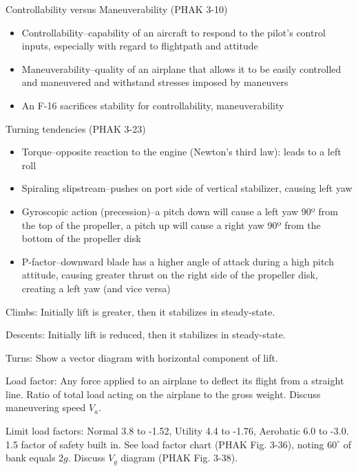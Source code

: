 Controllability versus Maneuverability (PHAK 3-10)

\begin{itemize}
  \item Controllability--capability of an aircraft to respond to the pilot's
    control inputs, especially with regard to flightpath and attitude

  \item Maneuverability--quality of an airplane that allows it to be easily
    controlled and maneuvered and withstand stresses imposed by maneuvers

  \item An F-16 sacrifices stability for controllability, maneuverability
\end{itemize}

Turning tendencies (PHAK 3-23)

\begin{itemize}
  \item Torque--opposite reaction to the engine (Newton's third law): leads to a
    left roll

  \item Spiraling slipstream--pushes on port side of vertical stabilizer,
    causing left yaw

  \item Gyroscopic action (precession)--a pitch down will cause a left yaw 90º
    from the top of the propeller, a pitch up will cause a right yaw 90º from
    the bottom of the propeller disk

  \item P-factor--downward blade has a higher angle of attack during a high
    pitch attitude, causing greater thrust on the right side of the propeller
    disk, creating a left yaw (and vice versa)
\end{itemize}

Climbs: Initially lift is greater, then it stabilizes in steady-state.

Descents: Initially lift is reduced, then it stabilizes in steady-state.

Turns: Show a vector diagram with horizontal component of lift.

Load factor: Any force applied to an airplane to deflect its flight from a
straight line. Ratio of total load acting on the airplane to the gross weight.
Discuss maneuvering speed $V_{a}$.

Limit load factors: Normal 3.8 to -1.52, Utility 4.4 to -1.76, Aerobatic 6.0 to
-3.0. 1.5 factor of safety built in. See load factor chart (PHAK Fig. 3-36),
noting $60^{\circ}$ of bank equals $2g$. Discuss $V_{g}$ diagram (PHAK Fig.
3-38).

